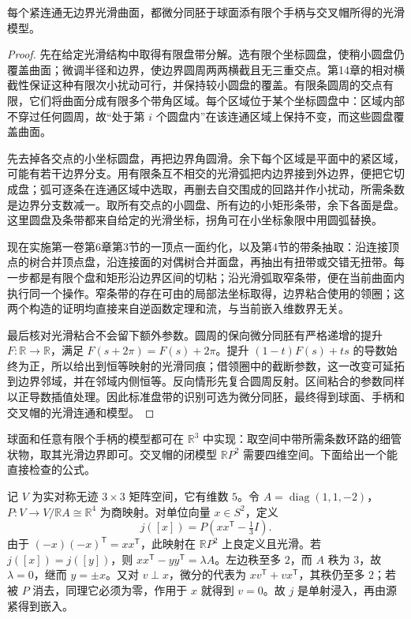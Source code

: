 \begin{lemma}\label{g2:lem:smooth-surface-band-model}
	每个紧连通无边界光滑曲面，都微分同胚于球面添有限个手柄与交叉帽所得的光滑模型。
\end{lemma}
\begin{proof}
	先在给定光滑结构中取得有限盘带分解。选有限个坐标圆盘，使稍小圆盘仍覆盖曲面；微调半径和边界，使边界圆周两两横截且无三重交点。第14章的相对横截性保证这种有限次小扰动可行，并保持较小圆盘的覆盖。有限条圆周的交点有限，它们将曲面分成有限多个带角区域。每个区域位于某个坐标圆盘中：区域内部不穿过任何圆周，故“处于第 \(i\) 个圆盘内”在该连通区域上保持不变，而这些圆盘覆盖曲面。

	先去掉各交点的小坐标圆盘，再把边界角圆滑。余下每个区域是平面中的紧区域，可能有若干边界分支。用有限条互不相交的光滑弧把内边界接到外边界，便把它切成盘；弧可逐条在连通区域中选取，再删去自交围成的回路并作小扰动，所需条数是边界分支数减一。取所有交点的小圆盘、所有边的小矩形条带，余下各面是盘。这里圆盘及条带都来自给定的光滑坐标，拐角可在小坐标象限中用圆弧替换。

	现在实施第一卷第6章第3节的一顶点一面约化，以及第4节的带条抽取：沿连接顶点的树合并顶点盘，沿连接面的对偶树合并面盘，再抽出有扭带或交错无扭带。每一步都是有限个盘和矩形沿边界区间的切粘；沿光滑弧取窄条带，便在当前曲面内执行同一个操作。窄条带的存在可由的局部法坐标取得，边界粘合使用的领圈；这两个构造的证明均直接来自逆函数定理和流，与当前嵌入维数界无关。

	最后核对光滑粘合不会留下额外参数。圆周的保向微分同胚有严格递增的提升 \(F:\mathbb R\to\mathbb R\)，满足 \(F(s+2\pi)=F(s)+2\pi\)。提升 \((1-t)F(s)+ts\) 的导数始终为正，所以给出到恒等映射的光滑同痕；借领圈中的截断参数，这一改变可延拓到边界邻域，并在邻域内侧恒等。反向情形先复合圆周反射。区间粘合的参数同样以正导数插值处理。因此标准盘带的识别可选为微分同胚，最终得到球面、手柄和交叉帽的光滑连通和模型。
\end{proof}

球面和任意有限个手柄的模型都可在 \(\mathbb R^3\) 中实现：取空间中带所需条数环路的细管状物，取其光滑边界即可。交叉帽的闭模型 \(\mathbb RP^2\) 需要四维空间。下面给出一个能直接检查的公式。

\begin{example}\label{g2:exm:rp2-four-dimensional-embedding}
	记 \(V\) 为实对称无迹 \(3\times3\) 矩阵空间，它有维数 \(5\)。令 \(A=\operatorname{diag}(1,1,-2)\)，\(P:V\to V/\mathbb RA\cong\mathbb R^4\) 为商映射。对单位向量 \(x\in S^2\)，定义
	\[
		j([x])=P\left(xx^{\mathsf T}-\tfrac13 I\right).
	\]
	由于 \((-x)(-x)^{\mathsf T}=xx^{\mathsf T}\)，此映射在 \(\mathbb RP^2\) 上良定义且光滑。若 \(j([x])=j([y])\)，则 \(xx^{\mathsf T}-yy^{\mathsf T}=\lambda A\)。左边秩至多 \(2\)，而 \(A\) 秩为 \(3\)，故 \(\lambda=0\)，继而 \(y=\pm x\)。又对 \(v\perp x\)，微分的代表为 \(xv^{\mathsf T}+vx^{\mathsf T}\)，其秩仍至多 \(2\)；若被 \(P\) 消去，同理它必须为零，作用于 \(x\) 就得到 \(v=0\)。故 \(j\) 是单射浸入，再由源紧得到嵌入。
\end{example}

